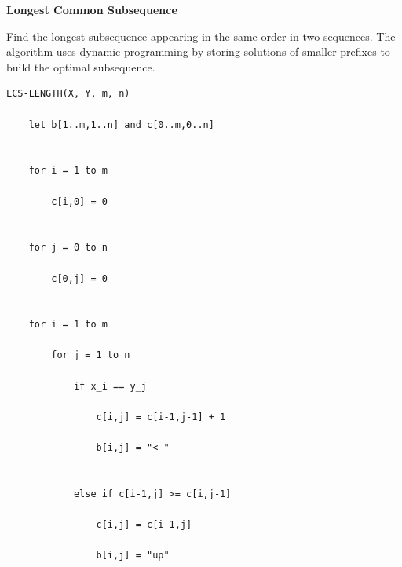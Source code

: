 \documentclass[a4paper,12pt]{article}
\begin{document}
\begin{tcolorbox}[
    colback=gray!30,
    colframe=black,
    boxrule=1pt,
    arc=0mm
]

\begin{tcolorbox}[
    colback=gray!10,
    colframe=black,
    arc=0mm
]
\centering
{\Huge\bfseries Longest Common Subsequence}
\end{tcolorbox}


\begin{tcolorbox}[
    colback=gray!10,
    colframe=black,
    arc=0mm
]
\small
Find the longest subsequence appearing in the same order in two sequences.
The algorithm uses dynamic programming by storing solutions of smaller
prefixes to build the optimal subsequence.
\end{tcolorbox}


\begin{tcolorbox}[
    colback=black!5,
    colframe=black,
    arc=0mm,
    title=Pseudo-code
]
\tiny
\begin{lstlisting}
LCS-LENGTH(X, Y, m, n)

    let b[1..m,1..n] and c[0..m,0..n]


    for i = 1 to m

        c[i,0] = 0


    for j = 0 to n

        c[0,j] = 0


    for i = 1 to m

        for j = 1 to n

            if x_i == y_j

                c[i,j] = c[i-1,j-1] + 1

                b[i,j] = "<-"


            else if c[i-1,j] >= c[i,j-1]

                c[i,j] = c[i-1,j]

                b[i,j] = "up"



\end{lstlisting}
\end{tcolorbox}
\end{tcolorbox}
\end{document}
